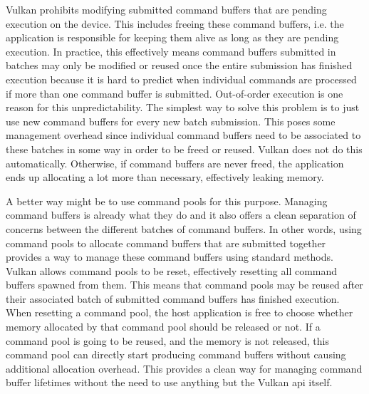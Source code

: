 
        Vulkan prohibits modifying submitted command buffers that are pending execution on the device.
        This includes freeing these command buffers, i.e. the application is responsible for keeping them alive as long as they are pending execution.
        In practice, this effectively means command buffers submitted in batches may only be modified or reused once the entire submission has finished execution because it is hard to predict when individual commands are processed if more than one command buffer is submitted.
        Out-of-order execution is one reason for this unpredictability.
        The simplest way to solve this problem is to just use new command buffers for every new batch submission.
        This poses some management overhead since individual command buffers need to be associated to these batches in some way in order to be freed or reused.
        Vulkan does not do this automatically.
        Otherwise, if command buffers are never freed, the application ends up allocating a lot more than necessary, effectively leaking memory.

        A better way might be to use command pools for this purpose.
        Managing command buffers is already what they do and it also offers a clean separation of concerns between the different batches of command buffers.
        In other words, using command pools to allocate command buffers that are submitted together provides a way to manage these command buffers using standard methods.
        Vulkan allows command pools to be reset, effectively resetting all command buffers spawned from them.
        This means that command pools may be reused after their associated batch of submitted command buffers has finished execution.
        When resetting a command pool, the host application is free to choose whether memory allocated by that command pool should be released or not.
        If a command pool is going to be reused, and the memory is not released, this command pool can directly start producing command buffers without causing additional allocation overhead.
        This provides a clean way for managing command buffer lifetimes without the need to use anything but the Vulkan \gls{api} itself.

